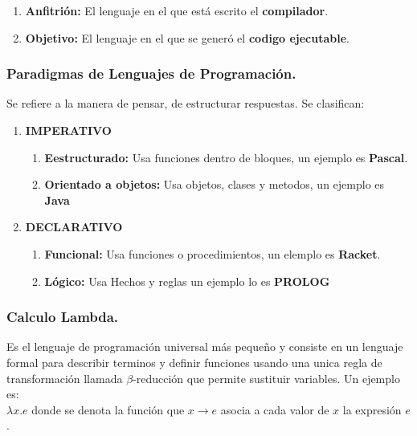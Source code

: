 \documentclass[12pt]{article}
\begin{document}
\begin{enumerate}
    \item \textbf{Anfitrión:} El lenguaje en el que está escrito el \textbf{compilador}.
    \item \textbf{Objetivo:} El lenguaje en el que se generó el \textbf{codigo ejecutable}.
\end{enumerate}


{\color{blue} \subsubsection*{Paradigmas de Lenguajes de Programación.}}
\vspace{-0.5em}
Se refiere a la manera de pensar, de estructurar respuestas. Se clasifican: \\

\begin{enumerate}
    \item \textbf{IMPERATIVO}
    \begin{enumerate}
        \item \textbf{Eestructurado:} Usa funciones dentro de bloques, un ejemplo es \textbf{Pascal}.
        \item \textbf{Orientado a objetos:} Usa objetos, clases y metodos, un ejemplo es \textbf{Java}
    \end{enumerate}
    \item \textbf{DECLARATIVO}
    \begin{enumerate}
        \item \textbf{Funcional:} Usa funciones o procedimientos, un elemplo es \textbf{Racket}.
        \item \textbf{Lógico:} Usa Hechos y reglas un ejemplo lo es \textbf{PROLOG}
    \end{enumerate}
\end{enumerate}

{\color{blue} \subsubsection*{Calculo Lambda.}}
\vspace{-0.5em}

Es el lenguaje de programación universal más pequeño y consiste en un lenguaje formal para describir terminos y definir funciones 
usando una unica regla de transformación llamada $\beta$-reducción que permite sustituir variables. 
Un ejemplo es:\\
$\lambda x. e$ donde se denota la función que $x \to e$ asocia a cada valor de $x$ la expresión $e$.
\\
\end{document}
